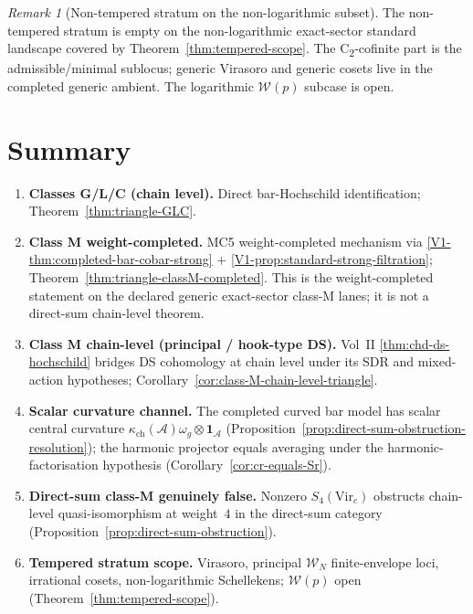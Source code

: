 \documentclass[11pt]{amsart}
\theoremstyle{definition}
\theoremstyle{remark}
\newtheorem{remark}[theorem]{Remark}
\providecommand{\cA}{\mathcal{A}}
\providecommand{\cW}{\mathcal{W}}
\begin{document}
\begin{remark}[Non-tempered stratum on the non-logarithmic subset]
\label{rem:non-tempered-empty}
The non-tempered stratum is empty on the non-logarithmic exact-sector
standard landscape covered by Theorem~\ref{thm:tempered-scope}. The
C\textsubscript{2}-cofinite part is the admissible/minimal sublocus;
generic Virasoro and generic cosets live in the completed generic
ambient. The logarithmic $\cW(p)$ subcase is open.
\end{remark}

\section{Summary}
\label{sec:summary-classM}

\begin{enumerate}[label=\textup{(\arabic*)}]
\item \textbf{Classes G/L/C (chain level).} Direct bar-Hochschild
  identification; Theorem~\ref{thm:triangle-GLC}.
\item \textbf{Class M weight-completed.} MC5 weight-completed mechanism via
  \ref*{V1-thm:completed-bar-cobar-strong} +
  \ref*{V1-prop:standard-strong-filtration};
  Theorem~\ref{thm:triangle-classM-completed}. This is the
  weight-completed statement on the declared generic exact-sector
  class-M lanes; it is not a direct-sum chain-level theorem.
\item \textbf{Class M chain-level (principal / hook-type DS).} Vol~II
  \ref*{thm:chd-ds-hochschild} bridges DS cohomology at chain
  level under its SDR and mixed-action hypotheses;
  Corollary~\ref{cor:class-M-chain-level-triangle}.
\item \textbf{Scalar curvature channel.} The completed curved bar
  model has scalar central curvature
  $\kappa_{\mathrm{ch}}(\cA)\omega_g\otimes\mathbf{1}_{\cA}$
  (Proposition~\ref{prop:direct-sum-obstruction-resolution}); the harmonic
  projector equals averaging under the harmonic-factorisation
  hypothesis
  (Corollary~\ref{cor:cr-equals-Sr}).
\item \textbf{Direct-sum class-M genuinely false.} Nonzero
  $S_4(\mathrm{Vir}_c)$ obstructs chain-level quasi-isomorphism
  at weight~$4$ in the direct-sum category
  (Proposition~\ref{prop:direct-sum-obstruction}).
\item \textbf{Tempered stratum scope.} Virasoro, principal $\cW_N$
  finite-envelope loci, irrational cosets, non-logarithmic
  Schellekens; $\cW(p)$ open
  (Theorem~\ref{thm:tempered-scope}).
\end{enumerate}
\end{document}
